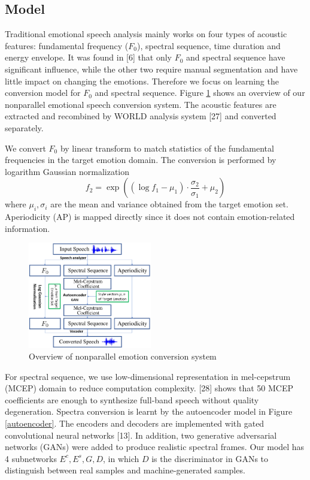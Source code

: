 \documentclass{article}
\begin{document}
\subsection{Model}
Traditional emotional speech analysis mainly works on four types of acoustic features: fundamental frequency ($F_0$), spectral sequence, time duration and energy envelope. It was found in [6] that only $F_0$ and spectral sequence have significant influence, while the other two require manual segmentation and have little impact on changing the emotions. Therefore we focus on learning the conversion model for $F_0$ and spectral sequence. Figure \ref{model} shows an overview of our nonparallel emotional speech conversion system. The acoustic features are extracted and recombined by WORLD analysis system [27] and converted separately.

We convert $F_0$ by linear transform to match statistics of the fundamental frequencies in the target emotion domain. The conversion is performed by logarithm Gaussian normalization
\begin{equation}
f_2 = \exp((\log f_1 - \mu_1)\cdot\frac{\sigma_2}{\sigma_1} + \mu_2)
\end{equation}
where $\mu_i, \sigma_i$ are the mean and variance obtained from the target emotion set. Aperiodicity (AP) is mapped directly since it does not contain emotion-related information.

\begin{figure}[htb]
\includegraphics[width=0.48\textwidth]{FIG/model}
\caption{Overview of nonparallel emotion conversion system}
\label{model}
\end{figure}

For spectral sequence, we use low-dimensional representation in mel-cepstrum (MCEP) domain to reduce computation complexity. [28] shows that 50 MCEP coefficients are enough to synthesize full-band speech without quality degeneration. Spectra conversion is learnt by the autoencoder model in Figure \ref{autoencoder}. The encoders and decoders are implemented with gated convolutional neural networks [13]. In addition, two generative adversarial networks (GANs) were added to produce realistic spectral frames. Our model has 4 subnetworks $E^c, E^s, G, D$, in which $D$ is the discriminator in GANs to distinguish between real samples and machine-generated samples.
\end{document}
